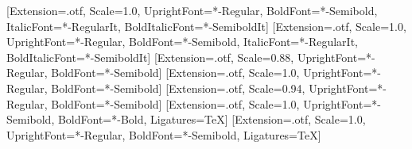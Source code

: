 %
\usepackage{fontspec}
\setsansfont{SourceSans3}[Extension=.otf, Scale=1.0,
  UprightFont=*-Regular, BoldFont=*-Semibold,
  ItalicFont=*-RegularIt, BoldItalicFont=*-SemiboldIt]
\setmainfont{SourceSerif4}[Extension=.otf, Scale=1.0,
  UprightFont=*-Regular, BoldFont=*-Semibold,
  ItalicFont=*-RegularIt, BoldItalicFont=*-SemiboldIt]
\setmonofont{SourceCodePro}[Extension=.otf, Scale=0.88,
  UprightFont=*-Regular, BoldFont=*-Semibold]
\newfontfamily{}[Extension=.otf, Scale=1.0,
  UprightFont=*-Regular, BoldFont=*-Semibold]
\newfontfamily{}[Extension=.otf, Scale=0.94,
  UprightFont=*-Regular, BoldFont=*-Semibold]
\newfontfamily{}[Extension=.otf, Scale=1.0,
  UprightFont=*-Semibold, BoldFont=*-Bold, Ligatures=TeX]
\newfontfamily{}[Extension=.otf, Scale=1.0,
  UprightFont=*-Regular, BoldFont=*-Semibold, Ligatures=TeX]


\usepackage{tikz}
\usetikzlibrary{arrows.meta}
\usepackage{array}
\usepackage{booktabs}
\usepackage{colortbl}

\hypersetup{hidelinks}

